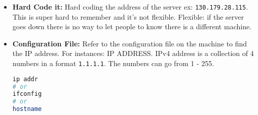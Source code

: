 \begin{itemize}[topsep=2pt]
    \item \textbf{Hard Code it:} Hard coding the address of the server ex: \texttt{130.179.28.115}. This is super hard to remember and it's not flexible. Flexible: if the server goes down there is no way to let people to know there is a different machine.
    \item \textbf{Configuration File:} Refer to the configuration file on the machine to find the IP address. For instances: IP ADDRESS. IPv4 address is a collection of 4 numbers in a format \texttt{1.1.1.1}. The numbers can go from 1 - 255.

\begin{lstlisting}[language=bash,caption=Getting the hostname from the configration file]
ip addr
# or
ifconfig
# or
hostname
\end{lstlisting}


\end{itemize}
